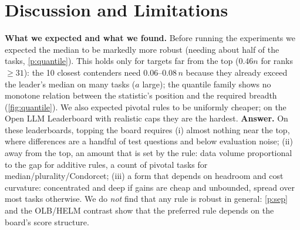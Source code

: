 \documentclass{article}
\theoremstyle{plain}
\theoremstyle{definition}
\theoremstyle{remark}
\begin{document}
\section{Discussion and Limitations}\label{sec:disc}
\textbf{What we expected and what we found.} Before running the experiments we expected the median to be markedly more robust (needing about half of the tasks, \cref{p:quantile}). This holds only for targets far from the top ($0.46n$ for ranks $\ge31$): the 10 closest contenders need $0.06$--$0.08\,n$ because they already exceed the leader's median on many tasks ($a$ large); the quantile family shows no monotone relation between the statistic's position and the required breadth (\cref{fig:quantile}). We also expected pivotal rules to be uniformly cheaper; on the Open LLM Leaderboard with realistic caps they are the hardest.
\textbf{Answer.} On these leaderboards, topping the board requires (i) almost nothing near the top, where differences are a handful of test questions and below evaluation noise; (ii) away from the top, an amount that is set by the rule: data volume proportional to the gap for additive rules, a count of pivotal tasks for median/plurality/Condorcet; (iii) a form that depends on headroom and cost curvature: concentrated and deep if gains are cheap and unbounded, spread over most tasks otherwise. We do \emph{not} find that any rule is robust in general: \cref{p:sep} and the OLB/HELM contrast show that the preferred rule depends on the board's score structure.
\end{document}
